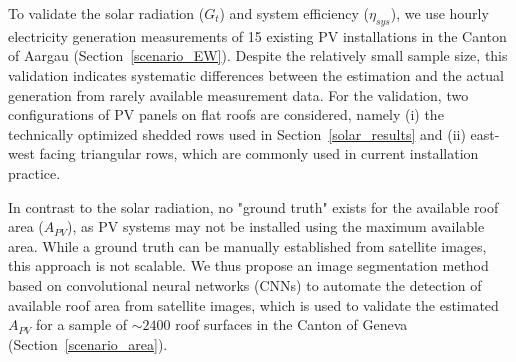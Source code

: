 To validate the solar radiation ($G_t$) and system efficiency ($\eta_\mathit{sys}$), we use hourly electricity generation measurements of 15 existing PV installations in the Canton of Aargau (Section~\ref{scenario_EW}).
Despite the relatively small sample size, this validation indicates systematic differences between the estimation and the actual generation from rarely available measurement data. 
For the validation, two configurations of PV panels on flat roofs are considered, namely (i) the technically optimized shedded rows used in Section~\ref{solar_results} and (ii) east-west facing triangular rows, which are commonly used in current installation practice.


In contrast to the solar radiation, no "ground truth" exists for the available roof area ($A_{PV}$), as PV systems may not be installed using the maximum available area.
While a ground truth can be manually established from satellite images, this approach is not scalable.
We thus propose an image segmentation method based on convolutional neural networks (CNNs) to automate the detection of available roof area from satellite images, which is used to validate the estimated $A_{PV}$ for a sample of $\sim 2400$ roof surfaces in the Canton of Geneva (Section~\ref{scenario_area}).


